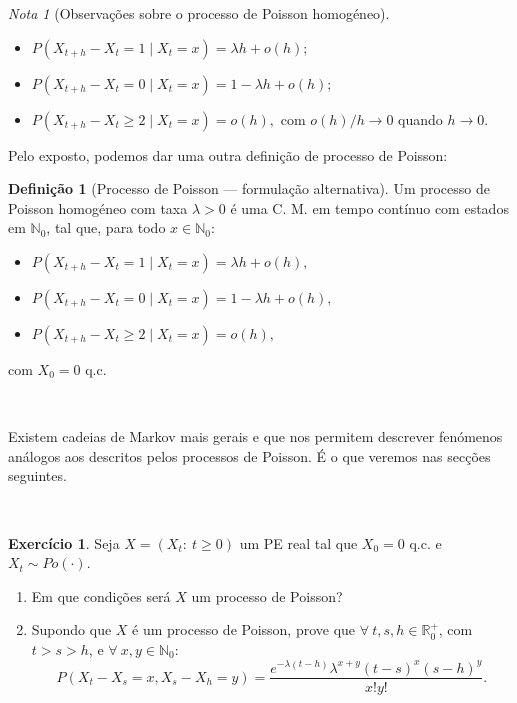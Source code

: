 \documentclass[
  11pt,
  a4paper,
]{book}
\theoremstyle{definition}
\newtheorem{definition}{Definição}[chapter]
\theoremstyle{definition}
\theoremstyle{definition}
\newtheorem{exercise}{Exercício}[chapter]
\theoremstyle{definition}
\theoremstyle{remark}
\newtheorem*{remark}{Nota }
\begin{document}
\begin{remark}[Observações sobre o processo de Poisson homogéneo]
\begin{enumerate}
  \begin{itemize}
  \item
    \(P(X_{t+h}-X_t=1\mid X_t=x)=\lambda h+o(h);\)
  \item
    \(P(X_{t+h}-X_t=0\mid X_t=x)=1-\lambda h+o(h);\)
  \item
    \(P(X_{t+h}-X_t\ge2\mid X_t=x)=o(h),\)
    com \(o(h)/h\to0\) quando \(h\to0\).
  \end{itemize}
\end{enumerate}

\end{remark}

Pelo exposto, podemos dar uma outra definição de processo de Poisson:

\begin{definition}[Processo de Poisson — formulação alternativa]
Um processo de Poisson homogéneo com taxa \(\lambda>0\) é uma C. M. em tempo contínuo com estados em \(\mathbb{N}_0\), tal que, para todo \(x\in\mathbb{N}_0\):

\begin{itemize}
\item
  \(P(X_{t+h}-X_t=1\mid X_t=x)=\lambda h+o(h),\)
\item
  \(P(X_{t+h}-X_t=0\mid X_t=x)=1-\lambda h+o(h),\)
\item
  \(P(X_{t+h}-X_t\ge2\mid X_t=x)=o(h),\)
\end{itemize}

com \(X_0=0\) q.c.
\end{definition}

\(\,\)

Existem cadeias de Markov mais gerais e que nos permitem descrever fenómenos análogos aos descritos pelos processos de Poisson. É o que veremos nas secções seguintes.

\(\,\)

\begin{exercise}
\leavevmode

Seja \(X=(X_t: ~t \geq 0)\) um PE real tal que \(X_0=0\) q.c. e \(X_t \sim Po(\cdot)\).

\begin{enumerate}
\def\labelenumi{(\alph{enumi})}
\item
  Em que condições será \(X\) um processo de Poisson?
\item
  Supondo que \(X\) é um processo de Poisson, prove que \(\forall ~t,s,h \in \mathbb{R}_0^+\), com \(t>s>h\), e \(\forall ~x,y \in \mathbb{N}_0\):
  \[P(X_t-X_s=x, X_s-X_h=y)=\dfrac{e^{-\lambda (t-h)} \lambda^{x+y} (t-s)^x (s-h)^y}{x!y!}.\]
\end{enumerate}

\end{exercise}
\end{document}
